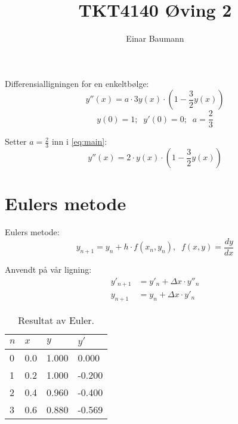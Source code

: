 



\author{Einar Baumann}
\title{TKT4140 Øving 2}
\maketitle

Differensialligningen for en enkeltbølge:
\begin{equation}
  y''(x) = a\cdot 3y(x)\cdot \left( 1 - \frac{3}{2}y(x) \right) \label{eq:main}
\end{equation}
\begin{equation*}
  y(0) = 1; \;\; y'(0) = 0; \;\; a = \frac{2}{3}
\end{equation*}

\noindent Setter $a=\frac{2}{3}$ inn i \eqref{eq:main}:
\begin{equation}
  y''(x) = 2 \cdot y(x)\cdot \left( 1 - \frac{3}{2}y(x) \right)
\end{equation}

\clearpage

\section{Eulers metode} %
\label{sec:eulers_metode}
\noindent Eulers metode:
\begin{equation}
  y_{n+1} = y_n + h \cdot f(x_n, y_n), \;\; f(x,y) = \frac{dy}{dx}
\end{equation}

\noindent Anvendt på vår ligning:
\begin{align}
  y'_{n+1} & = y'_n + \Delta x \cdot y''_n \\
  y_{n+1} & = y_n + \Delta x \cdot y'_n
\end{align}

\begin{table}[H]
  \centering
  \caption{Resultat av Euler.}
  \label{tab:euler}
  \begin{tabularx}{0.5\textwidth}{XXXX}
    \toprule
    $n$   & $x$   & $y$   & $y'$ \\
    \midrule
    0     & 0.0   & 1.000 & 0.000  \\
    1     & 0.2   & 1.000 & -0.200 \\
    2     & 0.4   & 0.960 & -0.400 \\
    3     & 0.6   & 0.880 & -0.569 \\
    \bottomrule
  \end{tabularx}
\end{table}

